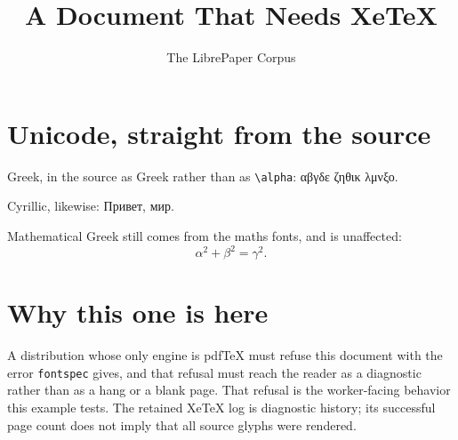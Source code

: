 \documentclass[11pt]{article}
\title{A Document That Needs XeTeX}
\author{The LibrePaper Corpus}
\date{}
\begin{document}
\maketitle

\section{Unicode, straight from the source}

Greek, in the source as Greek rather than as \verb|\alpha|: αβγδε ζηθικ λμνξο.

Cyrillic, likewise: Привет, мир.

Mathematical Greek still comes from the maths fonts, and is unaffected:
\begin{equation}
  \alpha^{2} + \beta^{2} = \gamma^{2}.
\end{equation}

\section{Why this one is here}

A distribution whose only engine is pdfTeX must refuse this document with the
error \verb|fontspec| gives, and that refusal must reach the reader as a
diagnostic rather than as a hang or a blank page. That refusal is the
worker-facing behavior this example tests. The retained XeTeX log is
diagnostic history; its successful page count does not imply that all source
glyphs were rendered.
\end{document}
